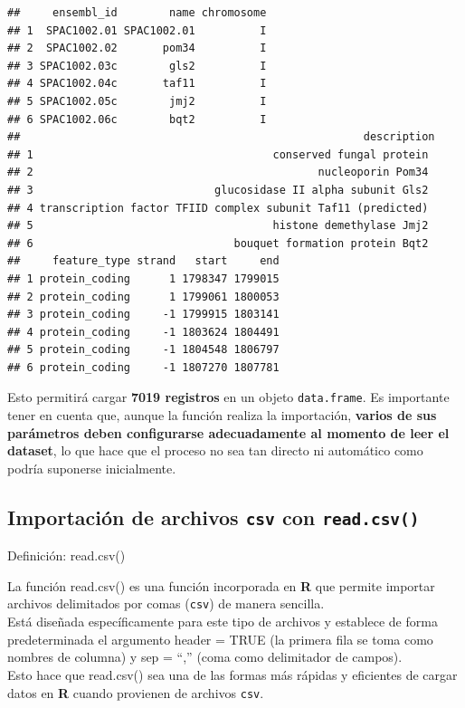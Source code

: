 \documentclass[
]{book}
\begin{document}
\begin{verbatim}
##     ensembl_id        name chromosome
## 1  SPAC1002.01 SPAC1002.01          I
## 2  SPAC1002.02       pom34          I
## 3 SPAC1002.03c        gls2          I
## 4 SPAC1002.04c       taf11          I
## 5 SPAC1002.05c        jmj2          I
## 6 SPAC1002.06c        bqt2          I
##                                                     description
## 1                                     conserved fungal protein 
## 2                                            nucleoporin Pom34 
## 3                            glucosidase II alpha subunit Gls2 
## 4 transcription factor TFIID complex subunit Taf11 (predicted) 
## 5                                     histone demethylase Jmj2 
## 6                               bouquet formation protein Bqt2 
##     feature_type strand   start     end
## 1 protein_coding      1 1798347 1799015
## 2 protein_coding      1 1799061 1800053
## 3 protein_coding     -1 1799915 1803141
## 4 protein_coding     -1 1803624 1804491
## 5 protein_coding     -1 1804548 1806797
## 6 protein_coding     -1 1807270 1807781
\end{verbatim}

Esto permitirá cargar \textbf{7019 registros} en un objeto \texttt{data.frame}. Es importante tener en cuenta que, aunque la función realiza la importación, \textbf{varios de sus parámetros deben configurarse adecuadamente al momento de leer el dataset}, lo que hace que el proceso no sea tan directo ni automático como podría suponerse inicialmente.

\subsection{\texorpdfstring{Importación de archivos \texttt{csv} con \texttt{read.csv()}}{Importación de archivos csv con read.csv()}}\label{importaciuxf3n-de-archivos-csv-con-read.csv}

{} Definición: read.csv()

La función read.csv() es una función incorporada en \textbf{R} que permite importar archivos delimitados por comas (\texttt{csv}) de manera sencilla.\\
Está diseñada específicamente para este tipo de archivos y establece de forma predeterminada el argumento
header = TRUE (la primera fila se toma como nombres de columna) y sep = ``,''
(coma como delimitador de campos).\\
Esto hace que read.csv() sea una de las formas más rápidas y eficientes de cargar datos en \textbf{R} cuando provienen de archivos \texttt{csv}.
\end{document}
